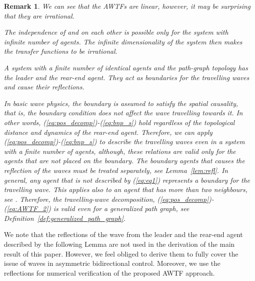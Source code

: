 \documentclass[10pt,twocolumn,twoside]{IEEEtran}
\newtheorem*{rem*}{Remark}
\theoremstyle{definition}
\newcommand{\revA}{Black}
\newcommand{\revB}{Black}
\begin{document}
\begin{rem*}
We can see that the AWTFs are linear, however, it may be surprising that they are irrational. {\color{\revB}The independence of  and  on each other is possible only for the system with infinite number of agents. The infinite dimensionality of the system then makes the transfer functions to be irrational.



A system with a finite number of identical agents and the path-graph topology has the leader and the rear-end agent. They act as boundaries for the travelling waves and cause their reflections.} In basic wave physics, the boundary is assumed to satisfy the spatial causality, that is, the boundary condition does not affect the wave travelling towards it. In other words, (\ref{eq:pos_decomp})-(\ref{eq:bnp_s}) hold regardless of the topological distance and dynamics of the rear-end agent. Therefore, we can apply (\ref{eq:pos_decomp})-(\ref{eq:bnp_s}) to describe the travelling waves even in a system with a finite number of agents, although, these relations are valid only for the agents that are not placed on the boundary. The boundary agents that causes the reflection of the waves must be treated separately, see Lemma~\ref{lem:refl}. In general, any agent that is not described by (\ref{eq:eq1}) represents a boundary for the travelling wave. This applies also to an agent that has more than two neighbours, see \cite{Martinec2015b}. Therefore, the travelling-wave decomposition, (\ref{eq:pos_decomp})-(\ref{eq:AWTF_2}) is valid even for a {\color{\revA}generalized path graph, see Definition~\ref{def:generalized_path_graph}}.



\end{rem*}



We note that the reflections of the wave from the leader and the rear-end agent described by the following Lemma are not used in the derivation of the main result of this paper. However, we feel obliged to derive them to fully cover the issue of waves in asymmetric bidirectional control. Moreover, we use the reflections for numerical verification of the proposed AWTF approach.
\end{document}
